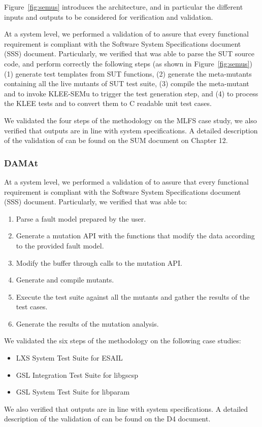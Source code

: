 Figure~\ref{fig:semus} introduces the \SEMUS architecture, and in particular the different inputs and outputs to be considered for verification and validation.

At a system level, we performed a validation of \SEMUS to assure that every functional requirement is compliant with the Software System Specifications document (SSS) document. Particularly, we verified that \SEMUS was able to parse the SUT source code, and perform correctly the following steps (as shown in Figure~\ref{fig:semus}) (1) generate test templates from SUT functions, (2) generate the meta-mutants containing all the live mutants of SUT test suite, (3) compile the meta-mutant and to invoke KLEE-SEMu to trigger the test generation step, and (4) to process the KLEE tests and to convert them to C readable unit test cases.

We validated the four steps of the methodology on the MLFS case study, we also verified that outputs are in line with system specifications. A detailed description of the validation of \SEMUS can be found on the SUM document on Chapter 12.


\subsubsection{DAMAt}

At a system level, we performed a validation of \DAMA to assure that every functional requirement is compliant with the Software System Specifications document (SSS) document.
Particularly, we verified that \DAMA was able to:
\begin{enumerate}
	\item Parse a fault model prepared by the user.
	\item Generate a mutation API with the functions that modify the data according to the provided fault model.
  \item Modify the buffer through calls to the mutation API.
	\item Generate and compile mutants.
	\item Execute the test suite against all the mutants and gather the results of the test cases.
	\item Generate the results of the mutation analysis.
\end{enumerate}

We validated the six steps of the methodology on the following case studies:
\begin{itemize}
  \item LXS System Test Suite for ESAIL
  \item GSL Integration Test Suite for libgscsp
  \item GSL System Test Suite for libparam
\end{itemize}

We also verified that outputs are in line with system specifications. A detailed description of the validation of \DAMA can be found on the D4 document.

\clearpage
